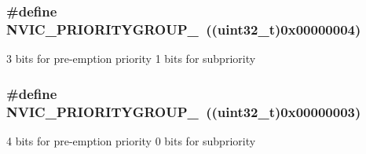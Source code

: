 \subsubsection[{\texorpdfstring{N\+V\+I\+C\+\_\+\+P\+R\+I\+O\+R\+I\+T\+Y\+G\+R\+O\+U\+P\+\_\+3}{NVIC_PRIORITYGROUP_3}}]{\setlength{\rightskip}{0pt plus 5cm}\#define N\+V\+I\+C\+\_\+\+P\+R\+I\+O\+R\+I\+T\+Y\+G\+R\+O\+U\+P\+\_~((uint32\+\_\+t)0x00000004)}\hypertarget{group___c_o_r_t_e_x___preemption___priority___group_ga8ddb24962e6f0fc3273139d45d374b09}{}\label{group___c_o_r_t_e_x___preemption___priority___group_ga8ddb24962e6f0fc3273139d45d374b09}
3 bits for pre-\/emption priority 1 bits for subpriority 
\subsubsection[{\texorpdfstring{N\+V\+I\+C\+\_\+\+P\+R\+I\+O\+R\+I\+T\+Y\+G\+R\+O\+U\+P\+\_\+4}{NVIC_PRIORITYGROUP_4}}]{\setlength{\rightskip}{0pt plus 5cm}\#define N\+V\+I\+C\+\_\+\+P\+R\+I\+O\+R\+I\+T\+Y\+G\+R\+O\+U\+P\+\_~((uint32\+\_\+t)0x00000003)}\hypertarget{group___c_o_r_t_e_x___preemption___priority___group_gae6eab9140204bc938255aa148e597c45}{}\label{group___c_o_r_t_e_x___preemption___priority___group_gae6eab9140204bc938255aa148e597c45}
4 bits for pre-\/emption priority 0 bits for subpriority 